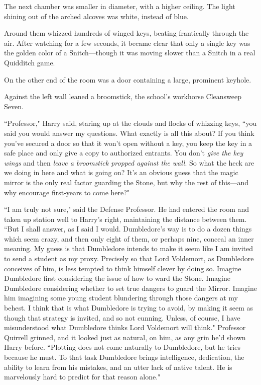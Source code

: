 \later

The next chamber was smaller in diameter, with a higher ceiling. The light shining out of the arched alcoves was white, instead of blue.

Around them whizzed hundreds of winged keys, beating frantically through the air. After watching for a few seconds, it became clear that only a single key was the golden color of a Snitch—though it was moving slower than a Snitch in a real Quidditch game.

On the other end of the room was a door containing a large, prominent keyhole.

Against the left wall leaned a broomstick, the school's workhorse Cleansweep Seven.

``Professor," Harry said, staring up at the clouds and flocks of whizzing keys, ``you said you would answer my questions. What exactly is all this about? If you think you've secured a door so that it won't open without a key, you keep the key in a safe place and only give a copy to authorized entrants. You don't \emph{give the key wings} and then \emph{leave a broomstick propped against the wall}. So what the heck are we doing in here and what is going on? It's an obvious guess that the magic mirror is the only real factor guarding the Stone, but why the rest of this—and why encourage first-years to come here?"

``I am truly not sure," said the Defense Professor. He had entered the room and taken up station well to Harry's right, maintaining the distance between them. ``But I shall answer, as I said I would. Dumbledore's way is to do a dozen things which seem crazy, and then only eight of them, or perhaps nine, conceal an inner meaning. My guess is that Dumbledore intends to make it seem like I am invited to send a student as my proxy. Precisely so that Lord Voldemort, as Dumbledore conceives of him, is less tempted to think himself clever by doing so. Imagine Dumbledore first considering the issue of how to ward the Stone. Imagine Dumbledore considering whether to set true dangers to guard the Mirror. Imagine him imagining some young student blundering through those dangers at my behest. I think that is what Dumbledore is trying to avoid, by making it seem as though that strategy is invited, and so not cunning. Unless, of course, I have misunderstood what Dumbledore thinks Lord Voldemort will think." Professor Quirrell grinned, and it looked just as natural, on him, as any grin he'd shown Harry before. ``Plotting does not come naturally to Dumbledore, but he tries because he must. To that task Dumbledore brings intelligence, dedication, the ability to learn from his mistakes, and an utter lack of native talent. He is marvelously hard to predict for that reason alone."

